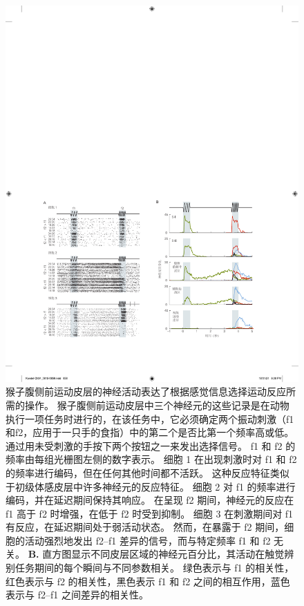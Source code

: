 \begin{figure}[htbp]
	\centering
	\includegraphics[width=1.0\linewidth]{chap34/fig_34_13}
	\caption{猴子腹侧前运动皮层的神经活动表达了根据感觉信息选择运动反应所需的操作\cite{romo2004neuronal}。
		猴子腹侧前运动皮层中三个神经元的这些记录是在动物执行一项任务时进行的，在该任务中，它必须确定两个振动刺激（f1和f2，应用于一只手的食指）中的第二个是否比第一个频率高或低。
		通过用未受刺激的手按下两个按钮之一来发出选择信号。
		f1 和 f2 的频率由每组光栅图左侧的数字表示。
		细胞 1 在出现刺激时对 f1 和 f2 的频率进行编码，但在任何其他时间都不活跃。
		这种反应特征类似于初级体感皮层中许多神经元的反应特征。
		细胞 2 对 f1 的频率进行编码，并在延迟期间保持其响应。
		在呈现 f2 期间，神经元的反应在 f1 高于 f2 时增强，在低于 f2 时受到抑制。
		细胞 3 在刺激期间对 f1 有反应，在延迟期间处于弱活动状态。
		然而，在暴露于 f2 期间，细胞的活动强烈地发出 f2–f1 差异的信号，而与特定频率 f1 和 f2 无关。
		\textbf{B.} 直方图显示不同皮层区域的神经元百分比，其活动在触觉辨别任务期间的每个瞬间与不同参数相关。
		绿色表示与 f1 的相关性，红色表示与 f2 的相关性，黑色表示 f1 和 f2 之间的相互作用，蓝色表示与 f2–f1 之间差异的相关性。}
	\label{fig:34_13}
\end{figure}



